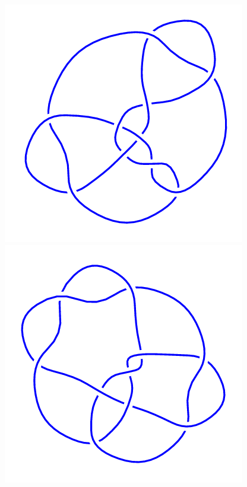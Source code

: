 \begin{figure}[H]
    \begin{minipage}[b]{.18\linewidth}
        \centering
        \includegraphics[width=\linewidth]{../data/10_107.png}
    \end{minipage}
    \begin{minipage}[b]{.18\linewidth}
        \centering
        \includegraphics[width=\linewidth]{../data/10_108.png}

\end{minipage}
\end{figure}
